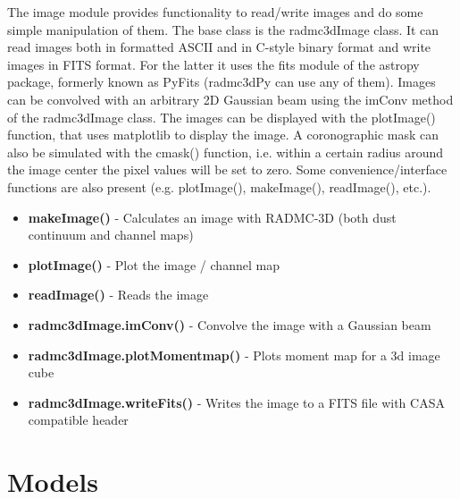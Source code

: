 \documentclass[12pt]{article}
\begin{document}
The image module provides functionality to read/write images and do some simple manipulation of them. 
The base class is the radmc3dImage class. It can read images both in formatted ASCII and in C-style binary format 
and write images in FITS format. For the latter it uses the fits module of the astropy package, formerly known as 
PyFits (radmc3dPy can use any of them). Images can be convolved with an arbitrary 2D Gaussian beam 
using the imConv method of the radmc3dImage class. The images can be displayed with the plotImage() function, 
that uses matplotlib to display the image. A coronographic mask can also be simulated with the cmask() function, 
i.e. within a certain radius around the image center the pixel values will be set to zero.  Some convenience/interface 
functions are also present (e.g. plotImage(), makeImage(), readImage(), etc.). 

\begin{itemize}
\item[]{\bf makeImage()} - Calculates an image with RADMC-3D (both dust continuum and channel maps)
\item[]{\bf plotImage()} - Plot the image / channel map
\item[]{\bf readImage()} - Reads the image 
\item[]{\bf radmc3dImage.imConv()} - Convolve the image with a Gaussian beam 
\item[]{\bf radmc3dImage.plotMomentmap()} - Plots moment map for a 3d image cube
\item[]{\bf radmc3dImage.writeFits()} - Writes the image to a FITS file with CASA compatible header
\end{itemize}

\section{Models}
\label{sec:model}
\end{document}
